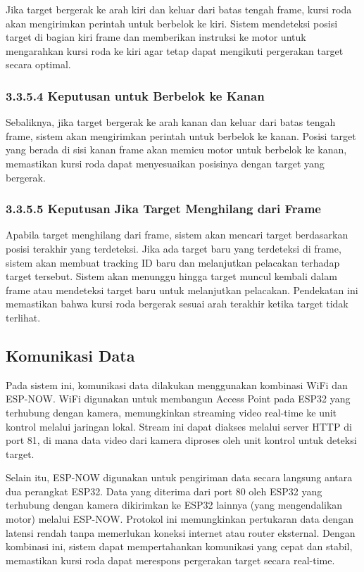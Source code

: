 Jika target bergerak ke arah kiri dan keluar dari batas tengah frame, kursi roda akan mengirimkan perintah untuk berbelok ke kiri. Sistem mendeteksi posisi target di bagian kiri frame dan memberikan instruksi ke motor untuk mengarahkan kursi roda ke kiri agar tetap dapat mengikuti pergerakan target secara optimal.

\subsubsection{3.3.5.4 Keputusan untuk Berbelok ke Kanan}
\label{subsubsec:keputusan_belok_kanan}

Sebaliknya, jika target bergerak ke arah kanan dan keluar dari batas tengah frame, sistem akan mengirimkan perintah untuk berbelok ke kanan. Posisi target yang berada di sisi kanan frame akan memicu motor untuk berbelok ke kanan, memastikan kursi roda dapat menyesuaikan posisinya dengan target yang bergerak.

\subsubsection{3.3.5.5 Keputusan Jika Target Menghilang dari Frame}
\label{subsubsec:keputusan_target_menghilang}

Apabila target menghilang dari frame, sistem akan mencari target berdasarkan posisi terakhir yang terdeteksi. Jika ada target baru yang terdeteksi di frame, sistem akan membuat tracking ID baru dan melanjutkan pelacakan terhadap target tersebut. Sistem akan menunggu hingga target muncul kembali dalam frame atau mendeteksi target baru untuk melanjutkan pelacakan. Pendekatan ini memastikan bahwa kursi roda bergerak sesuai arah terakhir ketika target tidak terlihat.

\subsection{Komunikasi Data}
\label{subsec:komunikasi_data}

Pada sistem ini, komunikasi data dilakukan menggunakan kombinasi WiFi dan ESP-NOW. WiFi digunakan untuk membangun Access Point pada ESP32 yang terhubung dengan kamera, memungkinkan streaming video real-time ke unit kontrol melalui jaringan lokal. Stream ini dapat diakses melalui server HTTP di port 81, di mana data video dari kamera diproses oleh unit kontrol untuk deteksi target.

Selain itu, ESP-NOW digunakan untuk pengiriman data secara langsung antara dua perangkat ESP32. Data yang diterima dari port 80 oleh ESP32 yang terhubung dengan kamera dikirimkan ke ESP32 lainnya (yang mengendalikan motor) melalui ESP-NOW. Protokol ini memungkinkan pertukaran data dengan latensi rendah tanpa memerlukan koneksi internet atau router eksternal. Dengan kombinasi ini, sistem dapat mempertahankan komunikasi yang cepat dan stabil, memastikan kursi roda dapat merespons pergerakan target secara real-time.

